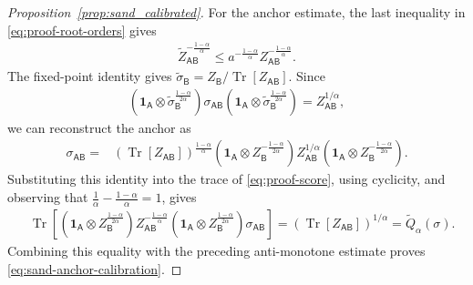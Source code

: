 \documentclass[11pt,reqno]{amsart}
\theoremstyle{definition}
\DeclareMathOperator{\Tr}{Tr}
\newcommand{\I}{\mathbf 1}
\newcommand{\A}{\mathsf{A}}
\newcommand{\B}{\mathsf{B}}
\newcommand{\sand}{\widetilde}
\begin{document}
\begin{proof}[Proposition~\ref{prop:sand_calibrated}]
For the anchor estimate, the last inequality in
\cref{eq:proof-root-orders} gives
\begin{align*}
\sand Z_{\A\B}^{-\frac{1-\alpha}{\alpha}}
\leq
a^{-\frac{1-\alpha}{\alpha}}
Z_{\A\B}^{-\frac{1-\alpha}{\alpha}}.
\end{align*}
The fixed-point identity gives
$\sand\sigma_{\B}=Z_{\B}/\Tr [Z_{\A\B}]$.  Since
\begin{align}
 (\I_{\A}\otimes\sand\sigma_{\B}^{\frac{1-\alpha}{2\alpha}})
 \sigma_{\A\B}
 (\I_{\A}\otimes\sand\sigma_{\B}^{\frac{1-\alpha}{2\alpha}})
 =Z_{\A\B}^{1/\alpha},
\end{align}
we can reconstruct the anchor as
\begin{align}
\sigma_{\A\B}
={}&(\Tr [Z_{\A\B}])^{\frac{1-\alpha}{\alpha}}
 (\I_{\A}\otimes Z_{\B}^{-\frac{1-\alpha}{2\alpha}})
 Z_{\A\B}^{1/\alpha}
 (\I_{\A}\otimes Z_{\B}^{-\frac{1-\alpha}{2\alpha}}).
\label{eq:proof-anchor-reconstruction}
\end{align}
Substituting this identity into the trace of \cref{eq:proof-score}, using
cyclicity, and observing that
$\frac{1}{\alpha}-\frac{1-\alpha}{\alpha}=1$, gives
\begin{align}
&\Tr\!\left[
(\I_{\A}\otimes Z_{\B}^{\frac{1-\alpha}{2\alpha}})
Z_{\A\B}^{-\frac{1-\alpha}{\alpha}}
(\I_{\A}\otimes Z_{\B}^{\frac{1-\alpha}{2\alpha}})
\sigma_{\A\B}
\right]=(\Tr [Z_{\A\B}])^{1/\alpha}
=\sand Q_{\alpha}(\sigma).
\end{align}
Combining this equality with the preceding anti-monotone estimate proves
\cref{eq:sand-anchor-calibration}.
\end{proof}





\end{document}
